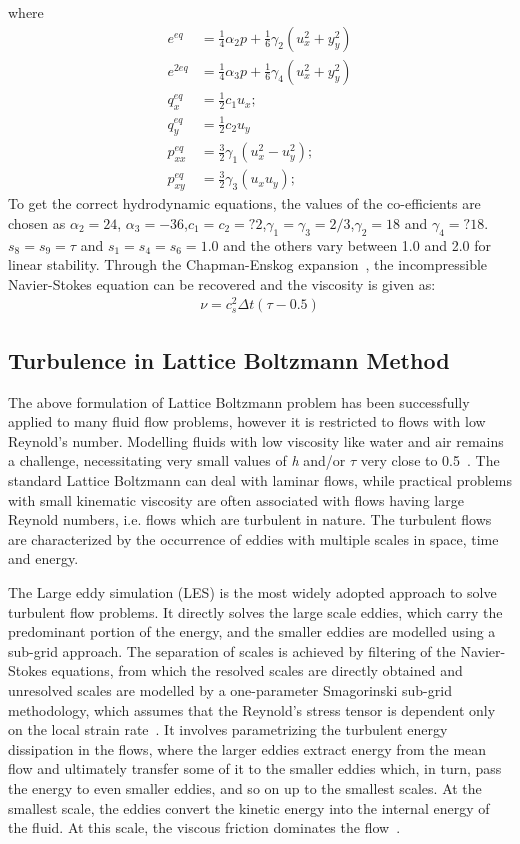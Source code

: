 \flushleft where
\begin{align}
e^{eq} & =\frac{1}{4}\alpha_2p+\frac{1}{6}\gamma_2(u_x^2+y_y^2)\\
e^{2eq} & =\frac{1}{4}\alpha_3p+\frac{1}{6}\gamma_4(u_x^2+y_y^2)\\
q_x^{eq} & =\frac{1}{2}c_1u_x;\\
q_y^{eq} & =\frac{1}{2}c_2u_y \\
p_{xx}^{eq} & =\frac{3}{2}\gamma_1(u_x^2 - u_y^2);\\
p_{xy}^{eq} & =\frac{3}{2}\gamma_3(u_xu_y);
\end{align}
To get the correct hydrodynamic equations, the values of the co-efficients are chosen as $\alpha_2=24$, $\alpha_3=-36$,$c_1=c_2=?2$,$\gamma_1=\gamma_3
=2/3$,$\gamma_2=18$ and $\gamma_4=?18$. $s_8 = s_9 = \tau$ and $s_1=s_4=s_6=1.0$ and the others vary between 1.0 and 2.0 for linear stability. Through the Chapman-Enskog expansion~\citep{Du2006}, the incompressible Navier-Stokes equation can be recovered and the viscosity is given as:
\begin{align}
\nu=c_s^2\Delta t(\tau-0.5)
\end{align}
 


\subsection{Turbulence in Lattice Boltzmann Method}
The above formulation of Lattice Boltzmann problem has been successfully applied to many fluid flow problems, however it is restricted to flows with low Reynold's number. Modelling fluids with low viscosity like water and air remains a challenge, necessitating very small values of \textit{h} and/or $\tau$ very close to 0.5~\citep{he1997}. The standard Lattice Boltzmann can deal with laminar flows, while practical problems with small kinematic viscosity are often associated with flows having large Reynold numbers, i.e. flows which are turbulent in nature. The turbulent flows are characterized by the occurrence of eddies with multiple scales in space, time and energy.

The Large eddy simulation (LES) is the most widely adopted approach to solve turbulent flow problems. It directly solves the large scale eddies, which carry the predominant portion of the energy, and the smaller eddies are modelled using a sub-grid approach. The separation of scales is achieved by filtering of the Navier-Stokes equations, from which the resolved scales are directly obtained and unresolved scales are modelled by a one-parameter Smagorinski sub-grid methodology, which assumes that the Reynold's stress tensor is dependent only on the local strain rate~\citep{smagorinsky1963}. It involves parametrizing the turbulent energy dissipation in the flows, where the larger eddies extract energy from the mean flow and ultimately transfer some of it to the smaller eddies which, in turn, pass the energy to even smaller eddies, and so on up to the smallest scales. At the smallest scale, the eddies convert the kinetic energy into the internal energy of the fluid. At this scale, the viscous friction dominates the flow~\citep{frisch1995}.


